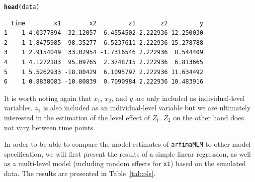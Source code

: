 \documentclass[12pt]{paper}\usepackage[]{graphicx}\usepackage[]{color}
\makeatletter
\newcommand{\hlstd}[1]{\textcolor[rgb]{0.345,0.345,0.345}{#1}}%
\newcommand{\hlkwd}[1]{\textcolor[rgb]{0.737,0.353,0.396}{\textbf{#1}}}%
\newenvironment{kframe}{%
 \def\at@end@of@kframe{}%
 \ifinner\ifhmode%
  \def\at@end@of@kframe{\end{minipage}}%
  \begin{minipage}{\columnwidth}%
 \fi\fi%
 \def\FrameCommand##1{\hskip\@totalleftmargin \hskip-\fboxsep
 \colorbox{shadecolor}{##1}\hskip-\fboxsep
     \hskip-\linewidth \hskip-\@totalleftmargin \hskip\columnwidth}%
 \MakeFramed {\advance\hsize-\width
   \@totalleftmargin\z@ \linewidth\hsize
   \@setminipage}}%
 {\par\unskip\endMakeFramed%
 \at@end@of@kframe}
\newenvironment{knitrout}{}{} %
\makeatother
\begin{document}
\begin{knitrout}
\color{fgcolor}\begin{kframe}
\begin{alltt}
\hlkwd{head}\hlstd{(data)}
\end{alltt}
\begin{verbatim}
  time        x1        x2         z1       z2         y
1    1 4.0377894 -32.12057  6.4554502 2.222936 12.250030
2    1 1.8475985 -98.35277  6.5237611 2.222936 15.278788
3    1 2.9154049  33.02954 -1.7316546 2.222936  8.544409
4    1 4.1272183  95.09765  2.3748715 2.222936  6.813665
5    1 5.5262933 -18.80429  6.1095797 2.222936 11.634492
6    1 0.8838083 -10.80839  0.7090984 2.222936 10.483916
\end{verbatim}
\end{kframe}
\end{knitrout}

It is worth noting again that $x_1$, $x_2$, and $y$ are only included as individual-level variables. $z_1$ is also included as an individual-level variable but we are ultimately interested in the estimation of the level effect of $\bar{Z}_t$. $Z_2$ on the other hand does not vary between time points.

In order to be able to compare the model estimates of \texttt{arfimaMLM} to other model specification, we will first present the results of a simple linear regression, as well as a multi-level model (including random effects for \texttt{x1}) based on the simulated data. The results are presented in Table~\ref{tab:ols}.
\end{document}
